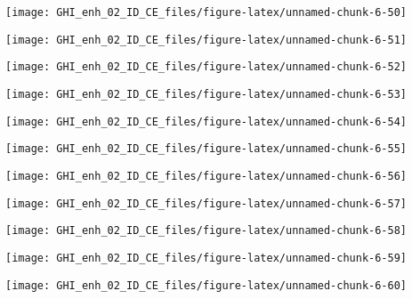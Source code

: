 \documentclass[
  10pt,
  a4paper,oneside]{article}
\begin{document}
\begin{center}\texttt{[image: GHI\_enh\_02\_ID\_CE\_files/figure-latex/unnamed-chunk-6-50]} \end{center}

\begin{center}\texttt{[image: GHI\_enh\_02\_ID\_CE\_files/figure-latex/unnamed-chunk-6-51]} \end{center}

\begin{center}\texttt{[image: GHI\_enh\_02\_ID\_CE\_files/figure-latex/unnamed-chunk-6-52]} \end{center}

\begin{center}\texttt{[image: GHI\_enh\_02\_ID\_CE\_files/figure-latex/unnamed-chunk-6-53]} \end{center}

\begin{center}\texttt{[image: GHI\_enh\_02\_ID\_CE\_files/figure-latex/unnamed-chunk-6-54]} \end{center}

\begin{center}\texttt{[image: GHI\_enh\_02\_ID\_CE\_files/figure-latex/unnamed-chunk-6-55]} \end{center}

\begin{center}\texttt{[image: GHI\_enh\_02\_ID\_CE\_files/figure-latex/unnamed-chunk-6-56]} \end{center}

\begin{center}\texttt{[image: GHI\_enh\_02\_ID\_CE\_files/figure-latex/unnamed-chunk-6-57]} \end{center}

\begin{center}\texttt{[image: GHI\_enh\_02\_ID\_CE\_files/figure-latex/unnamed-chunk-6-58]} \end{center}

\begin{center}\texttt{[image: GHI\_enh\_02\_ID\_CE\_files/figure-latex/unnamed-chunk-6-59]} \end{center}

\begin{center}\texttt{[image: GHI\_enh\_02\_ID\_CE\_files/figure-latex/unnamed-chunk-6-60]} \end{center}
\end{document}
